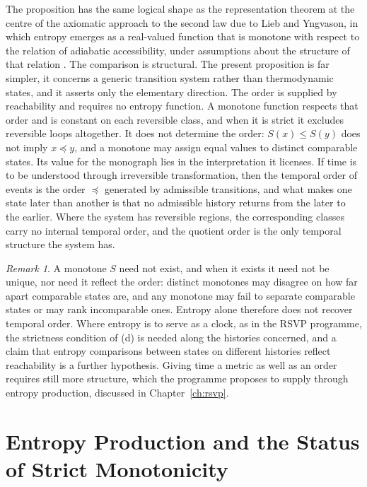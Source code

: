 \documentclass[11pt,twoside,openright]{book}
\theoremstyle{plain}
\theoremstyle{definition}
\theoremstyle{remark}
\newtheorem{remark}[theorem]{Remark}
\newcommand{\rsvp}{RSVP}
\begin{document}
The proposition has the same logical shape as the representation theorem at the centre of the axiomatic approach to the second law due to Lieb and Yngvason, in which entropy emerges as a real-valued function that is monotone with respect to the relation of adiabatic accessibility, under assumptions about the structure of that relation \cite{lieb1999}. The comparison is structural. The present proposition is far simpler, it concerns a generic transition system rather than thermodynamic states, and it asserts only the elementary direction. The order is supplied by reachability and requires no entropy function. A monotone function respects that order and is constant on each reversible class, and when it is strict it excludes reversible loops altogether. It does not determine the order: $S(x)\le S(y)$ does not imply $x\preceq y$, and a monotone may assign equal values to distinct comparable states. Its value for the monograph lies in the interpretation it licenses. If time is to be understood through irreversible transformation, then the temporal order of events is the order $\preceq$ generated by admissible transitions, and what makes one state later than another is that no admissible history returns from the later to the earlier. Where the system has reversible regions, the corresponding classes carry no internal temporal order, and the quotient order is the only temporal structure the system has.

\begin{remark}
A monotone $S$ need not exist, and when it exists it need not be unique, nor need it reflect the order: distinct monotones may disagree on how far apart comparable states are, and any monotone may fail to separate comparable states or may rank incomparable ones. Entropy alone therefore does not recover temporal order. Where entropy is to serve as a clock, as in the \rsvp{} programme, the strictness condition of (d) is needed along the histories concerned, and a claim that entropy comparisons between states on different histories reflect reachability is a further hypothesis. Giving time a metric as well as an order requires still more structure, which the programme proposes to supply through entropy production, discussed in Chapter~\ref{ch:rsvp}.
\end{remark}

\section{Entropy Production and the Status of Strict Monotonicity}
\end{document}
